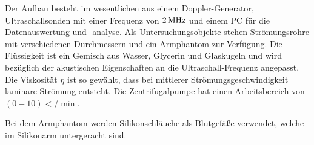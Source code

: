Der Aufbau besteht im wesentlichen aus einem Doppler-Generator,
Ultraschallsonden mit einer Frequenz von $2\,\si{\mega\hertz}$ und einem PC für die Datenauswertung
und -analyse. Als Untersuchungsobjekte stehen Strömungsrohre mit verschiedenen
Durchmessern und ein Armphantom zur Verfügung. Die Flüssigkeit ist ein Gemisch
aus Wasser, Glycerin und Glaskugeln und wird bezüglich der akustischen
Eigenschaften an die Ultraschall-Frequenz angepasst. Die Viskosität $\eta$ ist so
gewählt, dass bei mittlerer Strömungsgeschwindigkeit laminare Strömung
entsteht.
Die Zentrifugalpumpe hat einen Arbeitsbereich von $(0-10)\lt/\min$.

Bei dem Armphantom werden Silikonschläuche als Blutgefäße verwendet, welche
im Silikonarm untergeracht sind.
